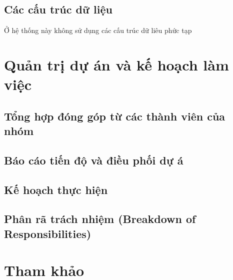 \documentclass[a4paper, 12pt]{article}
\begin{document}
\subsection{Các cấu trúc dữ liệu}

	Ở hệ thống này không sử dụng các cấu trúc dữ liêu phức tạp
	
	
	\clearpage
	
	\section{Quản trị dự án và kế hoạch làm việc}
	
	\subsection{Tổng hợp đóng góp từ các thành viên của nhóm}
	
	\subsection{Báo cáo tiến độ và điều phối dự á}
	
	\subsection{Kế hoạch thực hiện}
	
	\subsection{Phân rã trách nhiệm (Breakdown of Responsibilities)}
	
	\clearpage
	
	\section{Tham khảo}
	\clearpage
	
\end{document}
